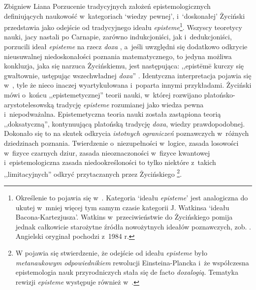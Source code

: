 \begin{artplenv}{Zbigniew Liana}
Porzucenie tradycyjnych założeń epistemologicznych definiujących naukowość w~kategoriach `wiedzy pewnej', i~`doskonałej'
Życiński przedstawia jako odejście od tradycyjnego ideału \textit{episteme}\footnote{Określenie to pojawia się
w~\parencite[s.~102]{zycinski_jezyk_1983}.
Kategoria `ideału \textit{episteme}' jest
analogiczna do ukutej w~mniej więcej tym samym czasie kategorii J. Watkinsa `ideału Bacona-Kartezjusza'. Watkins w~przeciwieństwie
do Życińskiego pomija jednak całkowicie starożytne źródła nowożytnych ideałów poznawczych, zob.
\parencite[s.~31–36]{watkins_nauka_1989}.
Angielski oryginał pochodzi z~1984 r.}.
Wszyscy teoretycy
nauki, jacy nastali po Carnapie, zarówno indukcjoniści, jak i~dedukcjoniści, porzucili ideał \textit{episteme} na rzecz
\textit{doxa}
\parencite[s.~107]{zycinski_jezyk_1983},
a~jeśli uwzględni się dodatkowo odkrycie nieusuwalnej
niedoskonałości poznania matematycznego, to jedyna możliwa konkluzja, jaka się narzuca Życińskiemu, jest następująca:
,,epist\=em\=e kurczy się gwałtownie, ustępując wszechwładnej \textit{doxa}''
\parencite[s.~109]{zycinski_jezyk_1983}.
Identyczna interpretacja pojawia się
w~\parencites[s.~12n]{zycinski_structure_1988}[s.~22n]{zycinski_struktura_2013},
tyle że nieco inaczej wyartykułowana i~poparta innymi przykładami. Życiński mówi o~końcu
,,epistemetycznej'' teorii nauki, w~której rozwijano platońsko-arystotelesowską tradycję \textit{episteme} rozumianej jako
wiedza pewna i~niepodważalna. Epistemetyczna teoria nauki została zastąpiona teorią ,,doksatyczną'', kontynuującą
platońską tradycję \textit{doxa}, wiedzy prawdopodobnej. Dokonało się to na skutek odkrycia \textit{istotnych ograniczeń}
poznawczych w~różnych dziedzinach poznania. Twierdzenie o~niezupełności w~logice, zasada losowości w~fizyce czarnych
dziur, zasada nieoznaczoności w~fizyce kwantowej i~epistemologiczna zasada niedookreśloności to tylko niektóre z~takich
,,limitacyjnych'' odkryć przytaczanych przez Życińskiego
\parencites*[zob.][s.~11]{zycinski_structure_1988}[s.~22n]{zycinski_struktura_2013}\footnote{W
\parencite[s.~129]{zycinski_elementy_1996}
pojawia się stwierdzenie, że
odejście od ideału \textit{episteme} było \textit{metanaukowym odpowiednikiem }rewolucji Einsteina-Plancka i~że współczesna
epistemologia nauk przyrodniczych stała się de facto \textit{doxalogią}. Tematyka rewizji \textit{episteme} występuje
również
w~\parencite[s.~55]{zycinski_granice_1993}.
}.


\end{artplenv}
